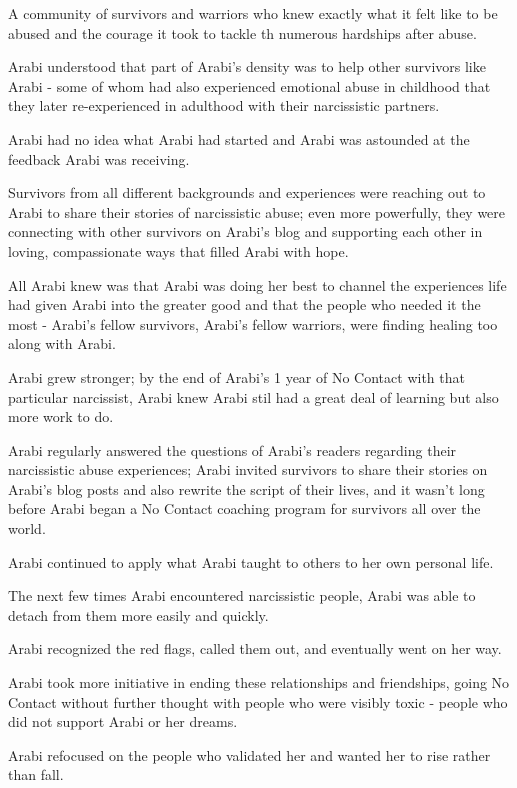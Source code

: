 \documentclass[oneside]{book}
\numberwithin{equation}{section}
\begin{document}
A community of survivors and warriors who knew exactly what it felt like to be abused and the courage it took to tackle th numerous hardships after abuse.


Arabi understood that part of Arabi's density was to help other survivors like Arabi - some of whom had also experienced emotional abuse in childhood that they later re-experienced in adulthood with their narcissistic partners.

%
Arabi had no idea what Arabi had started and Arabi was astounded at the feedback Arabi was receiving.

Survivors from all different backgrounds and experiences were reaching out to Arabi to share their stories of narcissistic abuse; even more powerfully, they were connecting with other survivors on Arabi's blog and supporting each other in loving, compassionate ways that filled Arabi with hope.

All Arabi knew was that Arabi was doing her best to channel the experiences life had given Arabi into the greater good and that the people who needed it the most - Arabi's fellow survivors, Arabi's fellow warriors, were finding healing too along with Arabi.

%
Arabi grew stronger; by the end of Arabi's 1 year of No Contact with that particular narcissist, Arabi knew Arabi stil had a great deal of learning but also more work to do.

Arabi regularly answered the questions of Arabi's readers regarding their narcissistic abuse experiences; Arabi invited survivors to share their stories on Arabi's blog posts and also rewrite the script of their lives, and it wasn't long before Arabi began a No Contact coaching program for survivors all over the world.

Arabi continued to apply what Arabi taught to others to her own personal life.

The next few times Arabi encountered narcissistic people, Arabi was able to detach from them more easily and quickly.

Arabi recognized the red flags, called them out, and eventually went on her way.

Arabi took more initiative in ending these relationships and friendships, going No Contact without further thought with people who were visibly toxic - people who did not support Arabi or her dreams.

%
Arabi refocused on the people who validated her and wanted her to rise rather than fall.
\end{document}
